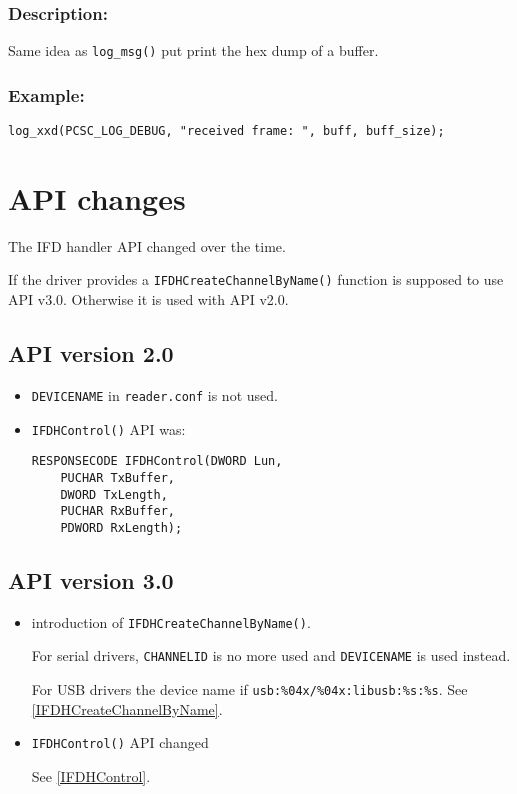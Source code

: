 \documentclass[a4paper,12pt]{article}
\newcommand{\desc}{\subsubsection{Description:}}
\newcommand{\example}{\subsubsection{Example:}}
\begin{document}
\desc

Same idea as \texttt{log\_msg()} put print the hex dump of a buffer.

\example
\begin{verbatim}
log_xxd(PCSC_LOG_DEBUG, "received frame: ", buff, buff_size);
\end{verbatim}


\section{API changes}

The IFD handler API changed over the time.

If the driver provides a \texttt{IFDHCreateChannelByName()} function is
supposed to use API v3.0. Otherwise it is used with API v2.0.


\subsection{API version 2.0}

\begin{itemize}
\item \texttt{DEVICENAME} in \texttt{reader.conf} is not used.

\item \texttt{IFDHControl()} API was:
\begin{verbatim}
RESPONSECODE IFDHControl(DWORD Lun,
    PUCHAR TxBuffer,
    DWORD TxLength,
    PUCHAR RxBuffer,
    PDWORD RxLength);
\end{verbatim}

\end{itemize}


\subsection{API version 3.0}

\begin{itemize}
\item introduction of \texttt{IFDHCreateChannelByName()}.

For serial drivers, \texttt{CHANNELID} is no more used and
\texttt{DEVICENAME} is used instead.

For USB drivers the device name if \verb+usb:%04x/%04x:libusb:%s:%s+.
See \ref{IFDHCreateChannelByName}.

\item \texttt{IFDHControl()} API changed

See \ref{IFDHControl}.

\end{itemize}




\end{document}
